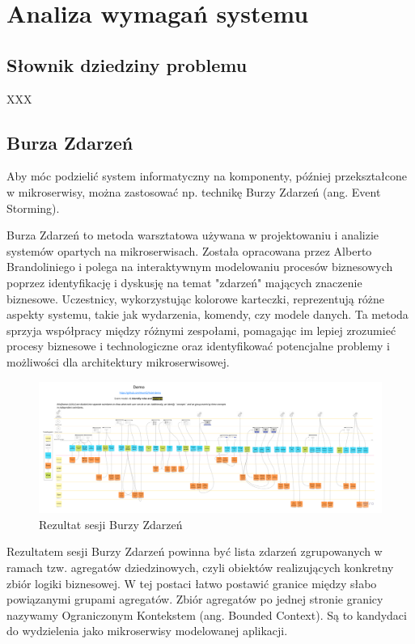 \clearpage %

\section{Analiza wymagań systemu}

\subsection{Słownik dziedziny problemu}

XXX

\subsection{Burza Zdarzeń}

Aby móc podzielić system informatyczny na komponenty, później przekształcone w mikroserwisy, można zastosować np. technikę Burzy Zdarzeń (ang. Event Storming).

Burza Zdarzeń to metoda warsztatowa używana w projektowaniu i analizie systemów opartych na mikroserwisach. Została opracowana przez Alberto Brandoliniego i polega na interaktywnym modelowaniu procesów biznesowych poprzez identyfikację i dyskusję na temat "zdarzeń" mających znaczenie biznesowe. Uczestnicy, wykorzystując kolorowe karteczki, reprezentują różne aspekty systemu, takie jak wydarzenia, komendy, czy modele danych. Ta metoda sprzyja współpracy między różnymi zespołami, pomagając im lepiej zrozumieć procesy biznesowe i technologiczne oraz identyfikować potencjalne problemy i możliwości dla architektury mikroserwisowej.

\begin{figure}[!h]
    \centering \includegraphics[width=0.8\linewidth]{event_storming.png}
    \caption{Rezultat sesji Burzy Zdarzeń \cite{event_storming_rys}}
\end{figure}


Rezultatem sesji Burzy Zdarzeń powinna być lista zdarzeń zgrupowanych w ramach tzw. agregatów dziedzinowych, czyli obiektów realizujących konkretny zbiór logiki biznesowej. W tej postaci łatwo postawić granice między słabo powiązanymi grupami agregatów. Zbiór agregatów po jednej stronie granicy nazywamy Ograniczonym Kontekstem (ang. Bounded Context). Są to kandydaci do wydzielenia jako mikroserwisy modelowanej aplikacji.

